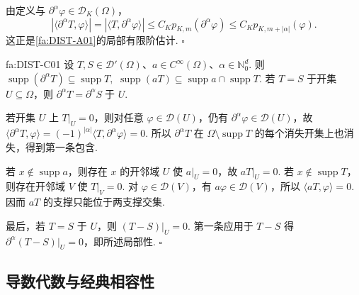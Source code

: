 \begin{FAProof}
由定义与 \(\displaystyle\partial^\alpha\varphi\in\mathcal D_K(\Omega)\)，
\[
|\langle\partial^\alpha T,\varphi\rangle|
=
|\langle T,\partial^\alpha\varphi\rangle|
\leqslant
C_Kp_{K,m}(\partial^\alpha\varphi)
\leqslant
C_Kp_{K,m+|\alpha|}(\varphi).
\]
这正是\autoref{fa:DIST-A01}的局部有限阶估计.
\hfill\(\square\)
\end{FAProof}

\begin{FAProposition}[C][分布支撑与局部性工具]{fa:DIST-C01}
设 \(\displaystyle T,S\in\mathcal D'(\Omega)\)、\(\displaystyle a\in C^\infty(\Omega)\)、\(\displaystyle\alpha\in\mathbb N_0^d\). 则 \(\displaystyle \operatorname{supp}(\partial^\alpha T) \subseteq \operatorname{supp}T,\) \(\displaystyle \operatorname{supp}(aT) \subseteq \operatorname{supp}a\cap\operatorname{supp}T.\)
若 \(\displaystyle T=S\) 于开集 \(\displaystyle U\subseteq\Omega\)，则 \(\displaystyle \partial^\alpha T=\partial^\alpha S \;\text{于 }U.\)
\end{FAProposition}

\begin{FAProof}
若开集 \(\displaystyle U\) 上 \(\displaystyle T|_U=0\)，则对任意 \(\displaystyle\varphi\in\mathcal D(U)\)，仍有 \(\displaystyle\partial^\alpha\varphi\in\mathcal D(U)\)，故 \(\displaystyle \langle\partial^\alpha T,\varphi\rangle = (-1)^{|\alpha|}\langle T,\partial^\alpha\varphi\rangle =0.\)
所以 \(\displaystyle\partial^\alpha T\) 在 \(\displaystyle\Omega\setminus\operatorname{supp}T\) 的每个消失开集上也消失，得到第一条包含.

若 \(\displaystyle x\notin\operatorname{supp}a\)，则存在 \(\displaystyle x\) 的开邻域 \(\displaystyle U\) 使 \(\displaystyle a|_U=0\)，故 \(\displaystyle aT|_U=0\). 若 \(\displaystyle x\notin\operatorname{supp}T\)，则存在开邻域 \(\displaystyle V\) 使 \(\displaystyle T|_V=0\). 对 \(\displaystyle\varphi\in\mathcal D(V)\)，有 \(\displaystyle a\varphi\in\mathcal D(V)\)，所以 \(\displaystyle\langle aT,\varphi\rangle=0\). 因而 \(\displaystyle aT\) 的支撑只能位于两支撑交集.

最后，若 \(\displaystyle T=S\) 于 \(\displaystyle U\)，则 \(\displaystyle(T-S)|_U=0\). 第一条应用于 \(\displaystyle T-S\) 得 \(\displaystyle\partial^\alpha(T-S)|_U=0\)，即所述局部性.
\hfill\(\square\)
\end{FAProof}

\subsection{导数代数与经典相容性}

